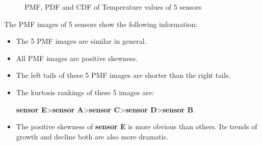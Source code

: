 \documentclass[a4paper]{article}
\begin{document}
\begin{figure}[htbp]
{\begin{minipage}[t]{0.33\linewidth}
\end{minipage}%
}%
%
\centering
\caption{PMF, PDF and CDF of Temperature values of 5 sensors}
\end{figure}
\noindent The PMF images of 5 sensors show the following information:
\begin{itemize}
    \item The 5 PMF images are similar in general.
    \item All PMF images are positive skewness.
    \item The left tails of these 5 PMF images are shorter than the right tails.
    \item The kurtosis rankings of these 5 images are:
    
    \textbf{sensor E}>\textbf{sensor A}>\textbf{sensor C}>\textbf{sensor D}>\textbf{sensor B}.
    \item The positive skewness of \textbf{sensor E} is more obvious than others. Its trends of growth and decline both are also more dramatic.
\end{itemize}
\end{document}
